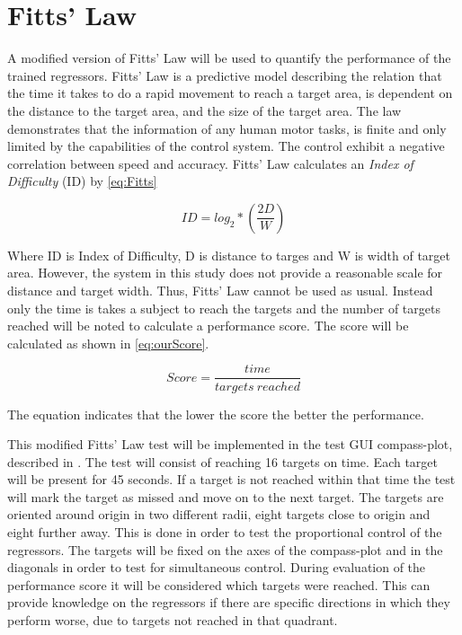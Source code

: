 \section{Fitts' Law}

A modified version of Fitts' Law will be used to quantify the performance of the trained regressors. Fitts' Law is a predictive model describing the relation that the time it takes to do a rapid movement to reach a target area, is dependent on the distance to the target area, and the size of the target area. The law demonstrates that the information of any human motor tasks, is finite and only limited by the capabilities of the control system. The control exhibit a negative correlation between speed and accuracy. \cite{Kamavuako2014}
Fitts' Law calculates an \textit{Index of Difficulty} (ID) by \eqref{eq:Fitts}

\begin{equation} \label{eq:Fitts}
ID = log_{2} * (\frac{2D}{W})
\end{equation}

Where ID is Index of Difficulty, D is distance to targes and W is width of target area. However, the system in this study does not provide a reasonable scale for distance and target width. Thus, Fitts' Law cannot be used as usual. Instead only the time is takes a subject to reach the targets and the number of targets reached will be noted to calculate a performance score. The score will be calculated as shown in \eqref{eq:ourScore}.

\begin{equation} \label{eq:ourScore}
	Score = \frac{time}{targets\ reached}
\end{equation}

The equation indicates that the lower the score the better the performance.

This modified Fitts' Law test will be implemented in the test GUI compass-plot, described in . The test will consist of reaching 16 targets on time. Each target will be present for 45 seconds. If a target is not reached within that time the test will mark the target as missed and move on to the next target. The targets are oriented around origin in two different radii, eight targets close to origin and eight further away. This is done in order to test the proportional control of the regressors. The targets will be fixed on the axes of the compass-plot and in the diagonals in order to test for simultaneous control. 
During evaluation of the performance score it will be considered which targets were reached. This can provide knowledge on the regressors if there are specific directions in which they perform worse, due to targets not reached in that quadrant. 


